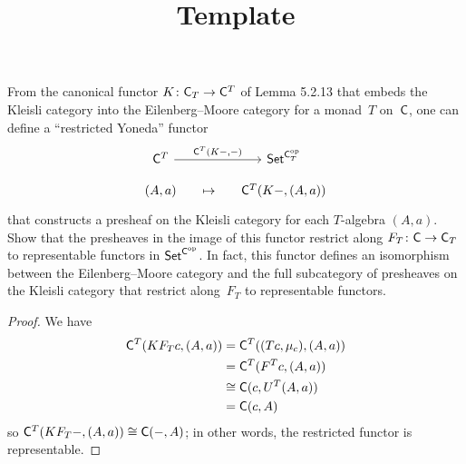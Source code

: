 \documentclass[../../solutions]{subfiles}
\title{Template}
\author{}
\begin{document}
\maketitle

%   

\begin{exercise}
  From the canonical functor ${K}\colon{{\mathsf{C}}_T}\to{{\mathsf{C}}^T}$ of Lemma 5.2.13
  that embeds the Kleisli category into the Eilenberg--Moore category
  for a monad~$T$ on~${\mathsf{C}}$, one can define a ``restricted Yoneda''
  functor
  $$
  \begin{tikzcd}[column sep=small, row sep=small]
    \sC^T
    \ar[rr, "{\sC^T(K-,-)}"]
    && \Set^{\sC_T^\op}
    \\
    (A,a)
    & \mapsto
    & \sC^T(K-,(A,a))
  \end{tikzcd}
  $$
  that constructs a presheaf on the Kleisli category for each
  $T$-algebra $(A,a)$.  Show that the presheaves in the image of this
  functor restrict along ${F_T}\colon{{\mathsf{C}}}\to{{\mathsf{C}}_T}$ to representable
  functors in $\mathsf{Set}^{{\mathsf{C}}^{\mathrm{op}}}$.  In fact, this functor defines an
  isomorphism between the Eilenberg--Moore category and the full
  subcategory of presheaves on the Kleisli category that restrict
  along~$F_T$ to representable functors.
\end{exercise}

\begin{proof}
  We have
  \begin{align*}
    {\mathsf{C}}^T(KF_Tc,(A,a))
    &= {\mathsf{C}}^T((Tc,\mu_c),(A,a)) \\
    &= {\mathsf{C}}^T(F^Tc,(A,a)) \\
    &\cong {\mathsf{C}}(c,U^T(A,a)) \\
    &= {\mathsf{C}}(c,A)
  \end{align*}
  so ${\mathsf{C}}^T(KF_T-,(A,a))\cong {\mathsf{C}}(-,A)$; in other words, the
  restricted functor is representable.
\end{proof}
\end{document}
